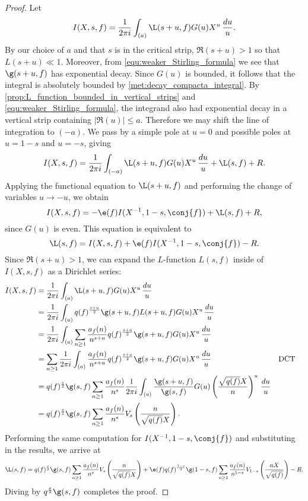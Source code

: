     \begin{proof}
      Let
      \[
        I(X,s,f) = \frac{1}{2\pi i}\int_{(a)}\L(s+u,f)G(u)X^{u}\,\frac{du}{u}.
      \]
      By our choice of $a$ and that $s$ is in the critical strip, $\Re(s+u) > 1$ so that $L(s+u) \ll 1$. Moreover, from \cref{equ:weaker_Stirling_formula} we see that $\g(s+u,f)$ has exponential decay. Since $G(u)$ is bounded, it follows that the integral is absolutely bounded by \cref{met:decay_compacta_integral}. By \cref{prop:L_function_bounded_in_vertical_strips} and \cref{equ:weaker_Stirling_formula}, the integrand also had exponential decay in a vertical strip containing $|\Re(u)| \le a$. Therefore we may shift the line of integration to $(-a)$. We pass by a simple pole at $u = 0$ and possible poles at $u = 1-s$ and $u = -s$, giving
      \[
        I(X,s,f) = \frac{1}{2\pi i}\int_{(-a)}\L(s+u,f)G(u)X^{u}\,\frac{du}{u}+\L(s,f)+R.
      \]
      Applying the functional equation to $\L(s+u,f)$ and performing the change of variables $u \to -u$, we obtain
      \[
        I(X,s,f) = -\e(f)I(X^{-1},1-s,\conj{f})+\L(s,f)+R,
      \]
      since $G(u)$ is even. This equation is equivalent to
      \[
        \L(s,f) = I(X,s,f)+\e(f)I(X^{-1},1-s,\conj{f})-R.
      \]
      Since $\Re(s+u) > 1$, we can expand the $L$-function $L(s,f)$ inside of $I(X,s,f)$ as a Dirichlet series:
      \begin{align*}
        I(X,s,f) &= \frac{1}{2\pi i}\int_{(a)}\L(s+u,f)G(u)X^{u}\,\frac{du}{u} \\
        &= \frac{1}{2\pi i}\int_{(a)}q(f)^{\frac{s+u}{2}}\g(s+u,f)L(s+u,f)G(u)X^{u}\,\frac{du}{u} \\
        &= \frac{1}{2\pi i}\int_{(a)}\sum_{n \ge 1}\frac{a_{f}(n)}{n^{s+u}}q(f)^{\frac{s+u}{2}}\g(s+u,f)G(u)X^{u}\,\frac{du}{u} \\
        &= \sum_{n \ge 1}\frac{1}{2\pi i}\int_{(a)}\frac{a_{f}(n)}{n^{s+u}}q(f)^{\frac{s+u}{2}}\g(s+u,f)G(u)X^{u}\,\frac{du}{u} && \text{DCT} \\
        &= q(f)^{\frac{s}{2}}\g(s,f)\sum_{n \ge 1}\frac{a_{f}(n)}{n^{s}}\frac{1}{2\pi i}\int_{(a)}\frac{\g(s+u,f)}{\g(s,f)}G(u)\left(\frac{\sqrt{q(f)}X}{n}\right)^{u}\,\frac{du}{u} \\
        &= q(f)^{\frac{s}{2}}\g(s,f)\sum_{n \ge 1}\frac{a_{f}(n)}{n^{s}}V_{s}\left(\frac{n}{\sqrt{q(f)}X}\right).
      \end{align*}
      Performing the same computation for $I(X^{-1},1-s,\conj{f})$ and substituting in the results, we arrive at
      \[
        \L(s,f) = q(f)^{\frac{s}{2}}\g(s,f)\sum_{n \ge 1}\frac{a_{f}(n)}{n^{s}}V_{s}\left(\frac{n}{\sqrt{q(f)}X}\right)+\e(f)q(f)^{\frac{1-s}{2}}\g(1-s,f)\sum_{n \ge 1}\frac{a_{f}(n)}{n^{1-s}}V_{1-s}\left(\frac{nX}{\sqrt{q(f)}}\right)-R.
      \]
      Diving by $q^{\frac{s}{2}}\g(s,f)$ completes the proof.
    \end{proof}

